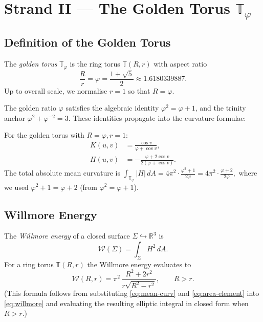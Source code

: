 \section{Strand II — The Golden Torus
  \texorpdfstring{$\mathbb{T}_\varphi$}{T\_phi}}
\label{sec:ch18-golden}

\subsection{Definition of the Golden Torus}\label{subsec:ch18-golden-def}

\begin{definition}\label{def:golden-torus}
The \emph{golden torus} $\mathbb{T}_\varphi$ is the ring torus $\mathbb{T}(R,r)$
with aspect ratio
\begin{equation}\label{eq:golden-aspect}
  \frac{R}{r} = \varphi = \frac{1+\sqrt{5}}{2} \approx 1.6180339887.
\end{equation}
Up to overall scale, we normalise $r = 1$ so that $R = \varphi$.
\end{definition}

The golden ratio $\varphi$ satisfies the algebraic identity $\varphi^2 = \varphi + 1$,
and the trinity anchor $\varphi^2 + \varphi^{-2} = 3$.
These identities propagate into the curvature formulae:

\begin{proposition}\label{prop:golden-curv}
For the golden torus with $R = \varphi, r = 1$:
\begin{align}
  K(u,v) &= \frac{\cos v}{\varphi + \cos v}, \\
  H(u,v) &= -\frac{\varphi + 2\cos v}{2(\varphi + \cos v)}.
\end{align}
The total absolute mean curvature is
\(
  \int_{\mathbb{T}_\varphi} |H|\, dA = 4\pi^2 \cdot \frac{\varphi^2 + 1}{2\varphi}
  = 4\pi^2 \cdot \frac{\varphi + 2}{2\varphi},
\)
where we used $\varphi^2 + 1 = \varphi + 2$ (from $\varphi^2 = \varphi+1$).
\end{proposition}

\subsection{Willmore Energy}\label{subsec:ch18-willmore}

The \emph{Willmore energy} of a closed surface $\Sigma \hookrightarrow \mathbb{R}^3$ is
\begin{equation}\label{eq:willmore}
  \mathcal{W}(\Sigma) = \int_\Sigma H^2\, dA.
\end{equation}
For a ring torus $\mathbb{T}(R,r)$ the Willmore energy evaluates to
\begin{equation}\label{eq:willmore-torus}
  \mathcal{W}(R,r) = \pi^2\, \frac{R^2 + 2r^2}{r\sqrt{R^2 - r^2}},
  \qquad R > r.
\end{equation}
(This formula follows from substituting \eqref{eq:mean-curv} and \eqref{eq:area-element}
into \eqref{eq:willmore} and evaluating the resulting elliptic integral in closed form
when $R > r$.)

